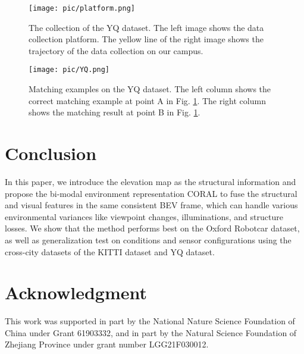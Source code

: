 \documentclass[letterpaper, 10 pt, conference]{ieeeconf}  \usepackage{tabularx}
\begin{document}
\begin{figure}[tp]
	\centering
	\texttt{[image: pic/platform.png]}
	
	\caption{The collection of the YQ dataset. The left image shows the data collection platform. The yellow line of the right image shows the trajectory of the data collection on our campus. }
	\label{YQ_p}
	\vspace{-10pt}
\end{figure}

\begin{figure}[tp]
    \vspace{2.6mm}
	\centering
	\texttt{[image: pic/YQ.png]}
	
	\caption{Matching examples on the YQ dataset. The left column shows the correct matching example at point A in Fig. \ref{YQ_p}. The right column shows the matching result at point B in Fig. \ref{YQ_p}.}
	\label{YQ}
	\vspace{-10pt}
\end{figure}

\section{Conclusion}

In this paper, we introduce the elevation map as the structural information and propose the bi-modal environment representation CORAL to fuse the structural and visual features in the same consistent BEV frame, which can handle various environmental variances like viewpoint changes, illuminations, and structure losses. We show that the method performs best on the Oxford Robotcar dataset, as well as generalization test on conditions and sensor configurations using the cross-city datasets of the KITTI dataset and YQ dataset.

\section{Acknowledgment}

This work was supported in part by the National Nature Science Foundation of China under Grant 61903332, and in part by the Natural Science Foundation of Zhejiang Province under grant number LGG21F030012.


\printbibliography
\end{document}
